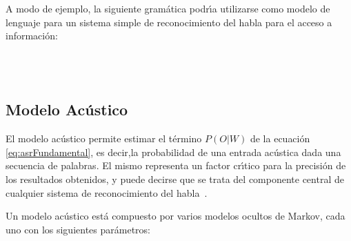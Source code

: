 A modo de ejemplo, la siguiente gram\'atica podr{\'\i}a utilizarse como modelo de lenguaje para un 
sistema simple de reconocimiento del habla para el acceso a informaci\'on:

\begin{bnf*}
{ \bnfsp {} \bnfsp {}  \bnfsp  {} \bnfsp {}} \\
{ \bnfor {} \bnfor {}} \\
{ \bnfor {} \bnfor {}}
\end{bnf*}

\subsection{Modelo Ac\'ustico}
El modelo ac\'ustico permite estimar el t\'ermino $P(O|W)$ de la ecuaci\'on \ref{eq:asrFundamental}, 
es decir,la probabilidad de una entrada ac\'ustica dada una secuencia de palabras.
El mismo representa un factor cr{\'\i}tico para la precisi\'on de los resultados obtenidos, y 
puede decirse que se trata del componente central de cualquier sistema de reconocimiento del 
\mbox{habla \cite{huang-handbook10}.}

Un modelo ac\'ustico est\'a compuesto por varios modelos ocultos de Markov, cada uno con
los siguientes par\'ametros:


